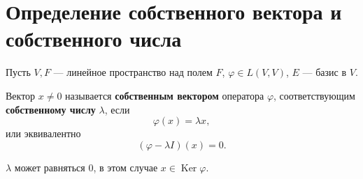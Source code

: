 \section{Определение собственного вектора и собственного числа}

\begin{definition}
Пусть $V, F$ --- линейное пространство над полем $F$, $\varphi \in L(V, V)$, $E$ --- базис в $V$.

Вектор $x \neq 0$ называется \textbf{собственным вектором} оператора $\varphi$, соответствующим \textbf{собственному числу} $\lambda$, если
\[
\varphi(x) = \lambda x,
\]
или эквивалентно
\[
(\varphi - \lambda I)(x) = 0.
\]

\begin{remark}
$\lambda$ может равняться $0$, в этом случае $x \in \operatorname{Ker} \varphi$.
\end{remark}
\end{definition}
